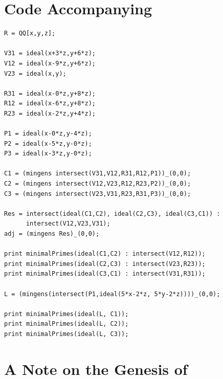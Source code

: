 \documentclass[a4paper,10pt]{amsart}
\theoremstyle{definition}
\theoremstyle{plain}
\begin{document}




\appendix

\section{Code Accompanying } \label{app:Code}

\begin{verbatim}
R = QQ[x,y,z];

V31 = ideal(x+3*z,y+6*z);
V12 = ideal(x-9*z,y+6*z);
V23 = ideal(x,y);

R31 = ideal(x-0*z,y+8*z);
R12 = ideal(x-6*z,y+8*z);
R23 = ideal(x-2*z,y+4*z);

P1 = ideal(x-0*z,y-4*z);
P2 = ideal(x-5*z,y-0*z);
P3 = ideal(x-3*z,y-0*z);

C1 = (mingens intersect(V31,V12,R31,R12,P1))_(0,0);
C2 = (mingens intersect(V12,V23,R12,R23,P2))_(0,0);
C3 = (mingens intersect(V23,V31,R23,R31,P3))_(0,0);

Res = intersect(ideal(C1,C2), ideal(C2,C3), ideal(C3,C1)) :
      intersect(V12,V23,V31);
adj = (mingens Res)_(0,0);

print minimalPrimes(ideal(C1,C2) : intersect(V12,R12));
print minimalPrimes(ideal(C2,C3) : intersect(V23,R23));
print minimalPrimes(ideal(C3,C1) : intersect(V31,R31));

L = (mingens(intersect(P1,ideal(5*x-2*z, 5*y-2*z))))_(0,0);

print minimalPrimes(ideal(L, C1));
print minimalPrimes(ideal(L, C2));
print minimalPrimes(ideal(L, C3));
\end{verbatim}


\section{A Note on the Genesis of } \label{sec:SolutionGenesis}
\end{document}
